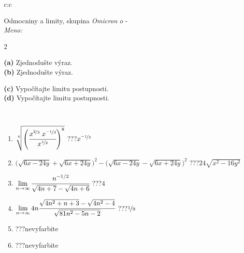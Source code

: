 \documentclass[10pt]{report}
\newcommand\omicron{o}
\begin{document}
\begin{tabular}{c:c}
\begin{minipage}[c][104.5mm][t]{0.5\linewidth}
\begin{center}
\vspace{7mm}
{\huge Odmocniny a limity, skupina \textit{Omicron $\omicron$} -}\\[5mm]
\textit{Meno:}\phantom{xxxxxxxxxxxxxxxxxxxxxxxxxxxxxxxxxxxxxxxxxxxxxxxxxxxxxxxxxxxxxxxxx}\\[5mm]
\begin{minipage}{0.95\linewidth}
\begin{center}
{\small \begin{multicols}{2} \raggedright
\textbf{(a)} Zjednodušte výraz. \\[1mm]
\textbf{(b)} Zjednodušte výraz. \par \columnbreak
\textbf{(c)} Vypočítajte limitu postupnosti. \\[1mm]
\textbf{(d)} Vypočítajte limitu postupnosti.
\end{multicols}
}
\end{center}
\end{minipage}
\\[4mm]
\begin{minipage}{0.79\linewidth}
\begin{center}
\begin{varwidth}{\linewidth}
\begin{enumerate}
\small
\item $\sqrt[4]{\left(\cfrac{x^{\nicefrac{2}{3}}\;x^{\nicefrac{-1}{3}}}{x^{\nicefrac{1}{2}}}\right)^{8}}$\quad \dotfill\; ???\;\dotfill \quad $x^{\nicefrac{-1}{3}}$
\item {\footnotesize{\scriptsize$\big(\sqrt{6x-24y}+\sqrt{6x+24y}\big)^2-\big(\sqrt{6x-24y}-\sqrt{6x+24y}\big)^2$}\quad \dotfill\; ???\;\dotfill \quad $24\sqrt{x^2-16y^2}$}
\item $\lim\limits_{n\to\infty}\cfrac{n^{-1/2}}{\sqrt{4n+7}-\sqrt{4n+6}}$\quad \dotfill\; ???\;\dotfill \quad $4$
\item $\lim\limits_{n\to\infty}4n\cfrac{\sqrt{4n^2+n+3}-\sqrt{4n^2-4}}{\sqrt{81n^2-5n-2}}$\quad \dotfill\; ???\;\dotfill \quad $\nicefrac{1}{9}$
\item \quad \dotfill\; ???\;\dotfill \quad nevyfarbite
\item \quad \dotfill\; ???\;\dotfill \quad nevyfarbite
\end{enumerate}
\end{varwidth}
\end{center}

\end{minipage}
\end{center}
\end{minipage}
\end{tabular}
\end{document}
